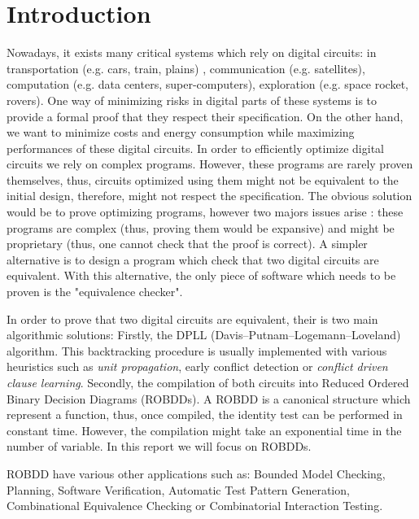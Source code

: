 \documentclass[a4paper,10pt]{article}
\begin{document}
\section{Introduction}

Nowadays, it exists many critical systems which rely on digital circuits: in transportation (e.g. cars, train, plains) , communication (e.g. satellites), computation (e.g. data centers, super-computers), exploration (e.g. space rocket, rovers).
One way of minimizing risks in digital parts of these systems is to provide a formal proof that they respect their specification.
On the other hand, we want to minimize costs and energy consumption while maximizing performances of these digital circuits.
In order to efficiently optimize digital circuits we rely on complex programs.
However, these programs are rarely proven themselves, thus, circuits optimized using them might not be equivalent to the initial design, therefore, might not respect the specification.
The obvious solution would be to prove optimizing programs, however two majors issues arise : these programs are complex  (thus, proving them would be expansive) and might be proprietary (thus, one cannot check that the proof is correct).
A simpler alternative is to design a program which check that two digital circuits are equivalent.
With this alternative, the only piece of software which needs to be proven is the "equivalence checker".


In order to prove that two digital circuits are equivalent, their is two main algorithmic solutions:
Firstly, the DPLL (Davis–Putnam–Logemann–Loveland) algorithm.
This backtracking procedure is usually implemented with various heuristics such as \textit{unit propagation}, early conflict detection or \textit{conflict driven clause learning}.
Secondly, the compilation of both circuits into Reduced Ordered Binary Decision Diagrams (ROBDDs).
A ROBDD is a canonical structure which represent a function, thus, once compiled, the identity test can be performed in constant time.
However, the compilation might take an exponential time in the number of variable.
In this report we will focus on ROBDDs.


ROBDD have various other applications such as: Bounded Model Checking, Planning, Software Verification, Automatic Test Pattern Generation, Combinational Equivalence Checking or Combinatorial Interaction Testing.

\end{document}
